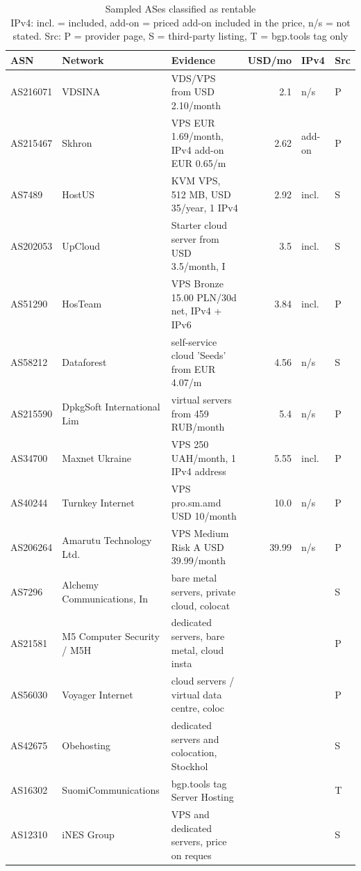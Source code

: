 \begin{table}[t]
\caption{
{\fontsize{20}{25}\selectfont  Sampled ASes classified as rentable\small } \\ 
{\fontsize{14}{17}\selectfont  IPv4: incl. = included, add-on = priced add-on included in the price, n/s = not stated. Src: P = provider page, S = third-party listing, T = bgp.tools tag only\small }
} 
\begin{tabular*}{\linewidth}{@{\extracolsep{\fill}}lllrll}
\toprule
ASN & Network & Evidence & USD/mo & IPv4 & Src \\ 
\midrule\addlinespace[2.5pt]
AS216071 & VDSINA & VDS/VPS from USD 2.10/month & 2.1 & n/s & P \\ 
AS215467 & Skhron & VPS EUR 1.69/month, IPv4 add-on EUR 0.65/m & 2.62 & add-on & P \\ 
AS7489 & HostUS & KVM VPS, 512 MB, USD 35/year, 1 IPv4 & 2.92 & incl. & S \\ 
AS202053 & UpCloud & Starter cloud server from USD 3.5/month, I & 3.5 & incl. & S \\ 
AS51290 & HosTeam & VPS Bronze 15.00 PLN/30d net, IPv4 + IPv6 & 3.84 & incl. & P \\ 
AS58212 & Dataforest & self-service cloud 'Seeds' from EUR 4.07/m & 4.56 & n/s & S \\ 
AS215590 & DpkgSoft International Lim & virtual servers from 459 RUB/month & 5.4 & n/s & P \\ 
AS34700 & Maxnet Ukraine & VPS 250 UAH/month, 1 IPv4 address & 5.55 & incl. & P \\ 
AS40244 & Turnkey Internet & VPS pro.sm.amd USD 10/month & 10.0 & n/s & P \\ 
AS206264 & Amarutu Technology Ltd. & VPS Medium Risk A USD 39.99/month & 39.99 & n/s & P \\ 
AS7296 & Alchemy Communications, In & bare metal servers, private cloud, colocat &  &  & S \\ 
AS21581 & M5 Computer Security / M5H & dedicated servers, bare metal, cloud insta &  &  & P \\ 
AS56030 & Voyager Internet & cloud servers / virtual data centre, coloc &  &  & P \\ 
AS42675 & Obehosting & dedicated servers and colocation, Stockhol &  &  & S \\ 
AS16302 & SuomiCommunications & bgp.tools tag Server Hosting &  &  & T \\ 
AS12310 & iNES Group & VPS and dedicated servers, price on reques &  &  & S \\ 

\end{tabular*}
\end{table}
